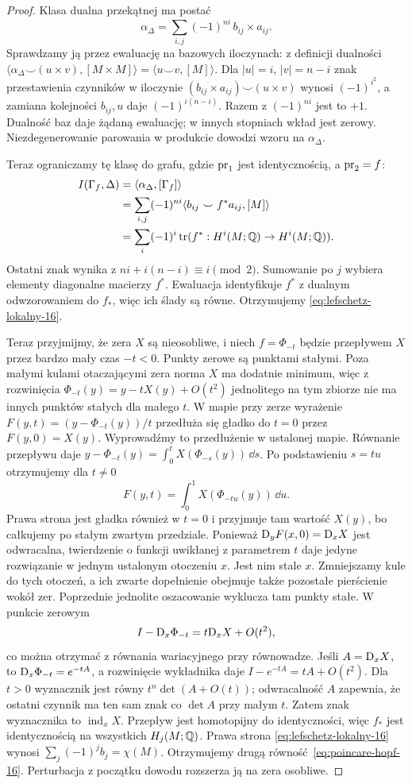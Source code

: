 \begin{proof}
Klasa dualna przekątnej ma postać
\[
 \alpha_\Delta=\sum_{i,j}(-1)^{ni}\,b_{ij}\times a_{ij}.
\]
Sprawdzamy ją przez ewaluację na bazowych iloczynach:
z definicji dualności
$\langle\alpha_\Delta\smile(u\times v),[M\times M]\rangle
=\langle u\smile v,[M]\rangle$.
Dla $|u|=i$, $|v|=n-i$ znak przestawienia czynników
w iloczynie $(b_{ij}\times a_{ij})\smile(u\times v)$
wynosi $(-1)^{i^2}$, a zamiana kolejności $b_{ij},u$
daje $(-1)^{i(n-i)}$. Razem z $(-1)^{ni}$ jest to
$+1$. Dualność baz daje żądaną ewaluację; w innych
stopniach wkład jest zerowy. Niezdegenerowanie
parowania w produkcie dowodzi wzoru na $\alpha_\Delta$.

Teraz ograniczamy tę klasę do grafu, gdzie
$\operatorname{pr}_1$ jest identycznością, a $\operatorname{pr}_2=f$:
\begin{align*}
 I(\Gamma_f,\Delta)
 &=\langle\alpha_\Delta,[\Gamma_f]\rangle\\
 &=\sum_{i,j}(-1)^{ni}
       \langle b_{ij}\smile f^*a_{ij},[M]\rangle\\
 &=\sum_i(-1)^i\operatorname{tr}
       (f^*:H^i(M;\mathbb{Q})\to H^i(M;\mathbb{Q})).
\end{align*}
Ostatni znak wynika z
$ni+i(n-i)\equiv i\pmod2$. Sumowanie po $j$
wybiera elementy diagonalne macierzy $f^*$.
Ewaluacja identyfikuje $f^*$ z dualnym odwzorowaniem
do $f_*$, więc ich ślady są równe. Otrzymujemy
\eqref{eq:lefschetz-lokalny-16}.

Teraz przyjmijmy, że
zera $X$ są nieosobliwe,
i niech $f=\Phi_{-t}$
będzie przepływem
$X$ przez bardzo
mały czas $-t<0$.
Punkty zerowe są
punktami stałymi.
Poza małymi kulami
otaczającymi zera
norma $X$ ma
dodatnie minimum,
więc z rozwinięcia
$\Phi_{-t}(y)=y-tX(y)+O(t^2)$
jednolitego na tym
zbiorze nie ma
innych punktów
stałych dla małego $t$.
W mapie przy zerze wyrażenie
$F(y,t)=(y-\Phi_{-t}(y))/t$ przedłuża się gładko
do $t=0$ przez $F(y,0)=X(y)$.
Wyprowadźmy to przedłużenie w ustalonej mapie.
Równanie przepływu daje
$y-\Phi_{-t}(y)=\int_0^t X(\Phi_{-s}(y))\,\dd s$.
Po podstawieniu $s=tu$ otrzymujemy dla $t\ne0$
\[
 F(y,t)=\int_0^1 X(\Phi_{-tu}(y))\,\dd u.
\]
Prawa strona jest gładka również w $t=0$ i przyjmuje
tam wartość $X(y)$, bo całkujemy po stałym zwartym przedziale.
Ponieważ
$\mathrm D_yF(x,0)=\mathrm D_xX$ jest odwracalna, twierdzenie
o funkcji uwikłanej z parametrem $t$ daje jedyne
rozwiązanie w jednym ustalonym otoczeniu $x$.
Jest nim stale $x$. Zmniejszamy kule do tych
otoczeń, a ich zwarte dopełnienie obejmuje także
pozostałe pierścienie wokół zer. Poprzednie
jednolite oszacowanie wyklucza tam punkty stałe.
W punkcie zerowym
\[
 I-\mathrm D_x\Phi_{-t}
   =t\mathrm D_xX+O(t^2),
\]
co można otrzymać z równania wariacyjnego przy równowadze.
Jeśli $A=\mathrm D_xX$, to $\mathrm D_x\Phi_{-t}=e^{-tA}$,
a rozwinięcie wykładnika daje $I-e^{-tA}=tA+O(t^2)$.
Dla $t>0$ wyznacznik jest równy $t^n\det(A+O(t))$;
odwracalność $A$ zapewnia, że ostatni czynnik
ma ten sam znak co $\det A$ przy małym $t$.
Zatem znak wyznacznika
to $\operatorname{ind}_xX$.
Przepływ jest
homotopijny do
identyczności,
więc $f_*$ jest
identycznością
na wszystkich
$H_j(M;\mathbb{Q})$.
Prawa strona
\eqref{eq:lefschetz-lokalny-16}
wynosi
$\sum_j(-1)^j b_j=\chi(M)$.
Otrzymujemy drugą
równość~\eqref{eq:poincare-hopf-16}.
Perturbacja z początku
dowodu rozszerza ją
na zera osobliwe.
\end{proof}

